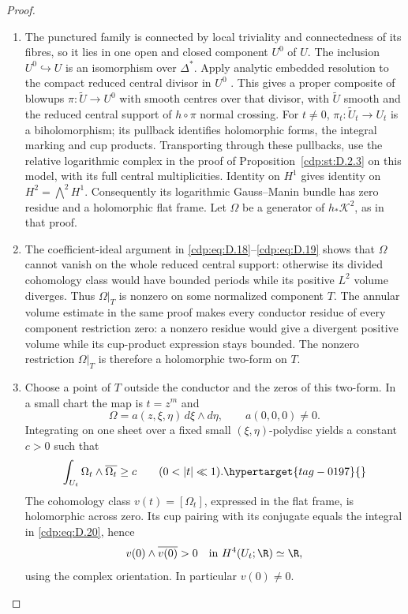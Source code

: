 \begin{proof}

\begin{enumerate}[leftmargin=*]
\item The punctured family is connected by local triviality and connectedness
of its fibres, so it lies in one open and closed component $U^0$ of $U$.
The inclusion $U^0\hookrightarrow U$ is an isomorphism over $\Delta^*$.
Apply analytic embedded resolution to the compact reduced central divisor
in $U^0$ \cite[\S0.2(2), preprint p.~3; Theorem~1.6 and Remarks~1.7,
preprint pp.~5--6]{BierstoneMilman1997}. This gives a proper composite
of blowups $\pi:\widetilde U\to U^0$ with smooth centres over that
divisor, with $\widetilde U$ smooth and the reduced central support
of $h\circ\pi$ normal crossing. For $t\ne0$,
$\pi_t:\widetilde U_t\to U_t$ is a biholomorphism;
its pullback identifies holomorphic forms, the integral marking and
cup products. Transporting through these pullbacks, use the relative
logarithmic complex in the proof of Proposition~\ref{cdp:st:D.2.3}
on this model, with its full central multiplicities.
Identity on $H^1$ gives identity on $H^2=\bigwedge^2H^1$.
Consequently its logarithmic Gauss--Manin bundle has zero
residue and a holomorphic flat frame. Let $\Omega$ be a
generator of $h_*\mathscr K^2$, as in that proof.

\item The coefficient-ideal argument in
\eqref{cdp:eq:D.18}--\eqref{cdp:eq:D.19} shows that $\Omega$
cannot vanish on the whole reduced central support: otherwise
its divided cohomology class would have bounded periods while
its positive $L^2$ volume diverges. Thus $\Omega|_T$ is nonzero
on some normalized component $T$. The annular volume estimate
in the same proof makes every conductor residue of every
component restriction zero: a nonzero residue would give a
divergent positive volume while its cup-product expression
stays bounded. The nonzero restriction $\Omega|_T$ is therefore
a holomorphic two-form on $T$.

\item Choose a point of $T$ outside the conductor and the zeros of
this two-form. In a small chart the map is $t=z^m$ and
\[
 \Omega=a(z,\xi,\eta)\,d\xi\wedge d\eta,
 \qquad a(0,0,0)\ne0.
\]
Integrating on one sheet over a fixed small
$(\xi,\eta)$-polydisc yields a constant $c>0$ such that
\begin{equation}
 \int_{U_t}\Omega_t\wedge\overline{\Omega_t}\ge c
 \qquad(0<|t|\ll1).
\hypertarget{tag-0197}{}\label{cdp:eq:D.20}
\end{equation}
The cohomology class $v(t)=[\Omega_t]$, expressed in the flat
frame, is holomorphic across zero. Its cup pairing with its conjugate equals the
integral in \eqref{cdp:eq:D.20}, hence
\[
 v(0)\wedge\overline{v(0)}>0
 \quad\hbox{in }H^4(U_t;\R)\simeq\R,
\]
using the complex orientation. In particular $v(0)\ne0$.


\end{enumerate}
\end{proof}
